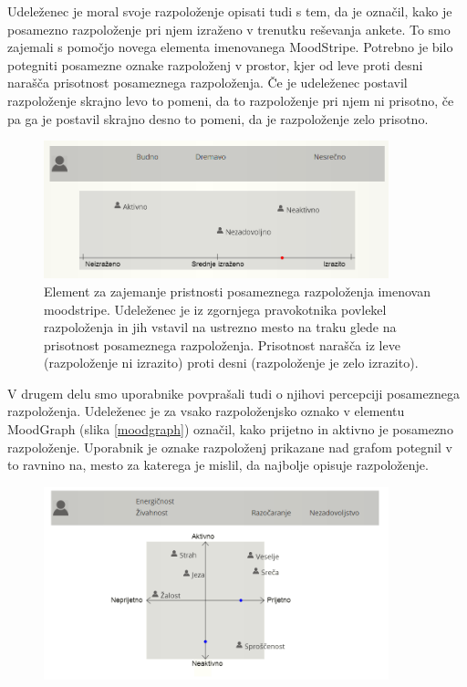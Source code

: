 \documentclass[a4paper, 12pt]{book}
\begin{document}
{Udeleženec je moral svoje razpoloženje opisati tudi s tem, da je označil, kako je posamezno razpoloženje pri njem izraženo v trenutku reševanja ankete. To smo zajemali s pomočjo novega elementa imenovanega MoodStripe. Potrebno je bilo potegniti posamezne oznake razpoloženj v prostor, kjer od leve proti desni narašča prisotnost posameznega razpoloženja. Če je udeleženec postavil razpoloženje skrajno levo to pomeni, da to razpoloženje pri njem ni prisotno, če pa ga je postavil skrajno desno to pomeni, da je razpoloženje zelo prisotno.

\begin{figure}[ht]
\centering
\includegraphics[width=10cm]{images/moodstripe.png}

\caption{Element za zajemanje pristnosti posameznega razpoloženja imenovan moodstripe. Udeleženec je iz zgornjega pravokotnika povlekel razpoloženja in jih vstavil na ustrezno mesto na traku glede na prisotnost posameznega razpoloženja. Prisotnost narašča iz leve (razpoloženje ni izrazito) proti desni (razpoloženje je zelo izrazito). }
\label{moodstripe}
\end{figure}

V drugem delu smo uporabnike povprašali tudi o njihovi percepciji posameznega razpoloženja. Udeleženec je za vsako razpoloženjsko oznako v elementu MoodGraph (slika \ref{moodgraph}) označil, kako prijetno in aktivno je posamezno razpoloženje. Uporabnik je oznake razpoloženj prikazane nad grafom potegnil v to ravnino na, mesto za katerega je mislil, da najbolje opisuje razpoloženje. 

\begin{figure}[ht]
\centering
\includegraphics[width=10cm]{images/enomoodgraph.png}


\end{figure}}
\end{document}
